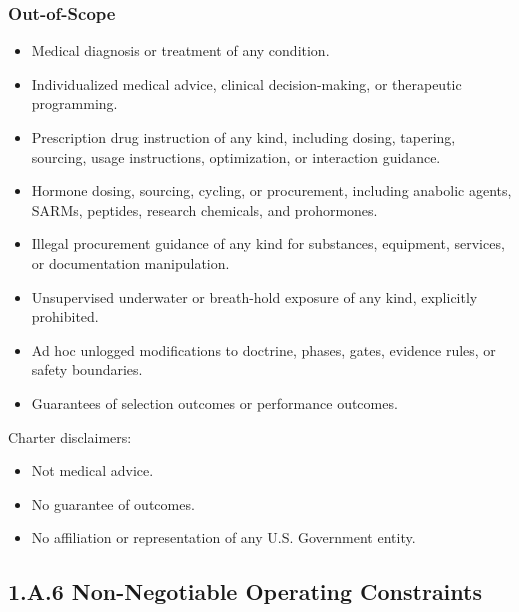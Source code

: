 \documentclass[10pt]{article}
\begin{document}
\subsubsection*{Out-of-Scope}

\begin{itemize}
\item Medical diagnosis or treatment of any condition.
\item Individualized medical advice, clinical decision-making, or therapeutic programming.
\item Prescription drug instruction of any kind, including dosing, tapering, sourcing, usage instructions, optimization, or interaction guidance.
\item Hormone dosing, sourcing, cycling, or procurement, including anabolic agents, SARMs, peptides, research chemicals, and prohormones.
\item Illegal procurement guidance of any kind for substances, equipment, services, or documentation manipulation.
\item Unsupervised underwater or breath-hold exposure of any kind, explicitly prohibited.
\item Ad hoc unlogged modifications to doctrine, phases, gates, evidence rules, or safety boundaries.
\item Guarantees of selection outcomes or performance outcomes.
\end{itemize}

Charter disclaimers:

\begin{itemize}
\item Not medical advice.
\item No guarantee of outcomes.
\item No affiliation or representation of any U.S. Government entity.
\end{itemize}

\subsection*{1.A.6 Non-Negotiable Operating Constraints}
{}
\end{document}

